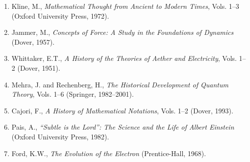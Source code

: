 \begin{enumerate}
\item Kline, M., \textit{Mathematical Thought from Ancient to Modern Times}, Vols. 1--3 (Oxford University Press, 1972).
\item Jammer, M., \textit{Concepts of Force: A Study in the Foundations of Dynamics} (Dover, 1957).
\item Whittaker, E.T., \textit{A History of the Theories of Aether and Electricity}, Vols. 1--2 (Dover, 1951).
\item Mehra, J. and Rechenberg, H., \textit{The Historical Development of Quantum Theory}, Vols. 1--6 (Springer, 1982--2001).
\item Cajori, F., \textit{A History of Mathematical Notations}, Vols. 1--2 (Dover, 1993).
\item Pais, A., \textit{``Subtle is the Lord'': The Science and the Life of Albert Einstein} (Oxford University Press, 1982).
\item Ford, K.W., \textit{The Evolution of the Electron} (Prentice-Hall, 1968).
\end{enumerate}

